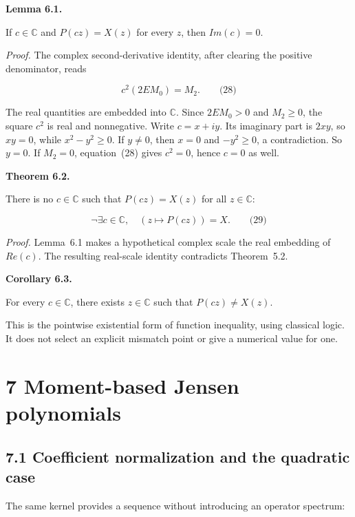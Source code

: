 \documentclass[
  11pt,
]{article}
\begin{document}
\textbf{Lemma 6.1.}

If \(c \in \mathbb{C}\) and \(P(cz) = X(z)\) for every \(z\), then \(Im(c) = 0\).

\emph{Proof.} The complex second-derivative identity, after clearing the positive denominator, reads

\[c^{2}\left( 2EM_{0} \right) = M_{2}.\quad\quad\text{(28)}\]

The real quantities are embedded into \(\mathbb{C}\). Since \(2EM_{0} > 0\) and \(M_{2} \geq 0\), the square \(c^{2}\) is real and nonnegative. Write \(c = x + iy\). Its imaginary part is \(2xy\), so \(xy = 0\), while \(x^{2} - y^{2} \geq 0\). If \(y \neq 0\), then \(x = 0\) and \(- y^{2} \geq 0\), a contradiction. So \(y = 0\). If \(M_{2} = 0\), equation~(28) gives \(c^{2} = 0\), hence \(c = 0\) as well.

\textbf{Theorem 6.2.}

There is no \(c \in \mathbb{C}\) such that \(P(cz) = X(z)\) for all \(z \in \mathbb{C}\):

\[\neg\exists c \in \mathbb{C},\quad\left( z \mapsto P(cz) \right) = X.\quad\quad\text{(29)}\]

\emph{Proof.} Lemma~6.1 makes a hypothetical complex scale the real embedding of \(Re(c)\). The resulting real-scale identity contradicts Theorem~5.2.

\textbf{Corollary 6.3.}

For every \(c \in \mathbb{C}\), there exists \(z \in \mathbb{C}\) such that \(P(cz) \neq X(z)\).

This is the pointwise existential form of function inequality, using classical logic. It does not select an explicit mismatch point or give a numerical value for one.

\hypertarget{moment-based-jensen-polynomials}{%
\section{7 Moment-based Jensen polynomials}\label{moment-based-jensen-polynomials}}

\hypertarget{coefficient-normalization-and-the-quadratic-case}{%
\subsection{7.1 Coefficient normalization and the quadratic case}\label{coefficient-normalization-and-the-quadratic-case}}

The same kernel provides a sequence without introducing an operator spectrum:
\end{document}
